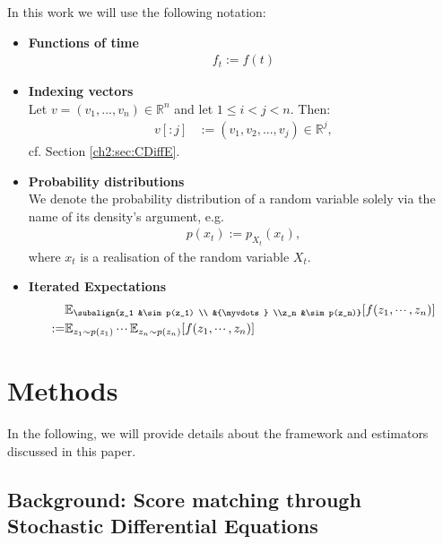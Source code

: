 In this work we will use the following notation:
\begin{itemize}
    \item \textbf{Functions of time}
    \begin{gather*}
        f_t := f(t)
    \end{gather*}
    \item \textbf{Indexing vectors} \\
    Let $v = (v_1, ..., v_n) \in \mathbb{R}^n$ and let $ 1 \leq i < j < n$. Then:
    \begin{align*}
        v[:j] &:= (v_1, v_{2}, ..., v_j) \in \mathbb{R}^{j},
    \end{align*}
    cf. Section \ref{ch2:sec:CDiffE}.
    \item \textbf{Probability distributions} \\
    We denote the probability distribution of a random variable solely via the name of its density's argument, e.g.
    \begin{gather*}
        p(x_t) := p_{X_t}(x_t),
    \end{gather*}   
    where $x_t$ is a realisation of the random variable $X_t$.
    \item \textbf{Iterated Expectations}
    \begin{align*}
        &\mathbb{E}_{\subalign{z_1 &\sim p(z_1) \\ &{\myvdots} \\z_n &\sim p(z_n)}}[f(z_1,\Compactcdots,z_n)] \\
        :=&\mathbb{E}_{z_1 \sim p(z_1)} \Compactcdots \mathbb{E}_{z_n \sim p(z_n)}[f(z_1,\Compactcdots,z_n)]
    \end{align*}
\end{itemize} 

\section{Methods}
In the following, we will provide details about the framework and estimators discussed in this paper.
\subsection{Background: Score matching through Stochastic Differential Equations}

